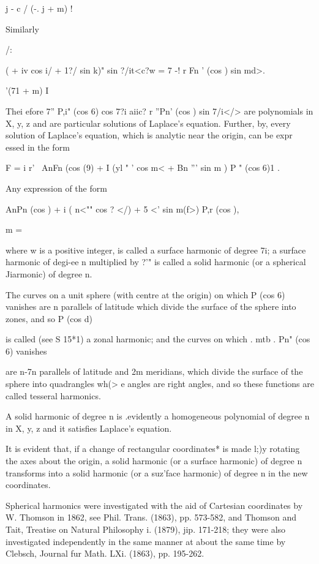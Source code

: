 j - c / (-. j + m) !

Similarly

/:

( + iv cos i/ + 1?/ sin k)" sin ?/it<c?w = 7 -! r Fn ' (cos ) sin md>.

'(71 + m) I

Thei efore 7'' P,i" (cos 6) cos 7?i aiic? r ''Pn' (cos ) sin 7/i</>
are polynomials in X, y, z and are particular solutions of Laplace's
equation. Further, by, every solution of Laplace's equation,
which is analytic near the origin, can be expr essed in the form

F = i r' \ AnFn (cos (9) + I (yl " ' cos m< + Bn ''' sin m ) P " (cos
6)1 .

Any expression of the form

AnPn (cos ) + i ( n<"" cos ? </) + 5 <' sin m(f>) P,r (cos ),

m = \

where w is a positive integer, is called a surface harmonic of degree
7i; a surface harmonic of degi-ee n multiplied by ?'" is called a
solid harmonic (or a spherical Jiarmonic) of degree n.

The curves on a unit sphere (with centre at the origin) on which P
(cos 6) vanishes are n parallels of latitude which divide the surface
of the sphere into zones, and so P (cos d)

is called (see S 15*1) a zonal harmonic; and the curves on which .
mtb . Pn" (cos 6) vanishes

are n-7n parallels of latitude and 2m meridians, which divide the
surface of the sphere into quadrangles wh(> e angles are right angles,
and so these functions are called tesseral harmonics.

%
%

A solid harmonic of degree n is .evidently a homogeneous polynomial of
degree n in X, y, z and it satisfies Laplace's equation.

It is evident that, if a change of rectangular coordinates* is made
l;)y rotating the axes about the origin, a solid harmonic (or a
surface harmonic) of degree n transforms into a solid harmonic (or a
suz'face harmonic) of degree n in the new coordinates.

Spherical harmonics were investigated with the aid of Cartesian
coordinates by W. Thomson in 1862, see Phil. Trans. (1863), pp.
573-582, and Thomson and Tait, Treatise on Natural Philosophy i.
(1879), jip. 171-218; they were also investigated independently in
the same manner at about the same time by Clebsch, Journal fur Math.
LXi. (1863), pp. 195-262.

